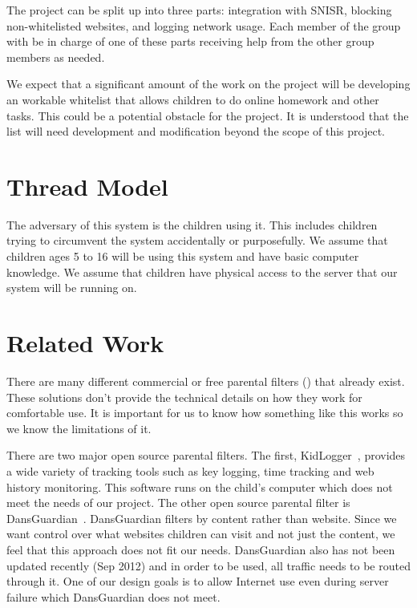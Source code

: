 \documentclass[12pt] {article}
\begin{document}
The project can be split up into three parts: integration with SNISR, blocking
non-whitelisted websites, and logging network usage. Each member of the group
with be in charge of one of these parts receiving help from the other group
members as needed.

We expect that a significant amount of the work on the project will be
developing an workable whitelist that allows children to do online homework and
other tasks. This could be a potential obstacle for the project. It is
understood that the list will need development and modification beyond the
scope of this project.


\section*{Thread Model}
The adversary of this system is the children using it. This includes children
trying to circumvent the system accidentally or purposefully. We assume that
children ages 5 to 16 will be using this system and have basic computer
knowledge.  We assume that children have physical access to the server that our
system will be running on.


\section*{Related Work}
There are many different commercial or free parental filters
(\cite{k9}\cite{netnanny}\cite{mcafee}) that already exist. These solutions
don't provide the technical details on how they work for comfortable use. It is
important for us to know how something like this works so we know the
limitations of it.

There are two major open source parental filters. The first,
KidLogger~\cite{kidlogger}, provides a wide variety of tracking tools such as
key logging, time tracking and web history monitoring. This software runs on
the child's computer which does not meet the needs of our project. The other
open source parental filter is DansGuardian~\cite{dansgaurdian}. DansGuardian
filters by content rather than website. Since we want control over what
websites children can visit and not just the content, we feel that this
approach does not fit our needs.  DansGuardian also has not been updated
recently (Sep 2012) and in order to be used, all traffic needs to be routed
through it. One of our design goals is to allow Internet use even during server
failure which DansGuardian does not meet.
\end{document}
